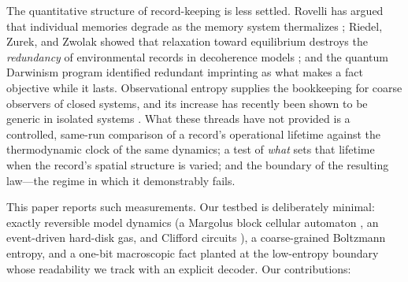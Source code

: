 \documentclass[aps,pre,twocolumn,superscriptaddress,nofootinbib,longbibliography]{revtex4-2}
\begin{document}
The quantitative structure of record-keeping is less settled. Rovelli has argued that
individual memories degrade as the memory system thermalizes \cite{rovelli2020memory};
Riedel, Zurek, and Zwolak showed that relaxation toward equilibrium destroys the
\emph{redundancy} of environmental records in decoherence models \cite{riedel2012risefall};
and the quantum Darwinism program
\cite{zurek2003rmp,zurek2009darwinism,ollivier2004,blumekohout2006} identified redundant
imprinting as what makes a fact objective while it lasts. Observational entropy
\cite{safranek2019a,safranek2019b,safranek2021intro,strasberg2021} supplies the bookkeeping
for coarse observers of closed systems, and its increase has recently been shown to be
generic in isolated systems \cite{nagasawa2024}. What these threads have not provided is a
controlled, same-run comparison of a record's operational lifetime against the
thermodynamic clock of the same dynamics; a test of \emph{what} sets that lifetime when the
record's spatial structure is varied; and the boundary of the resulting law---the regime in
which it demonstrably fails.

This paper reports such measurements. Our testbed is deliberately minimal: exactly
reversible model dynamics (a Margolus block cellular automaton
\cite{margolus1984,toffolimargolus1987}, an event-driven hard-disk gas, and Clifford
circuits \cite{gottesman1998,aaronsongottesman2004}), a coarse-grained Boltzmann entropy,
and a one-bit macroscopic fact planted at the low-entropy boundary whose readability we
track with an explicit decoder. Our contributions:
\end{document}
